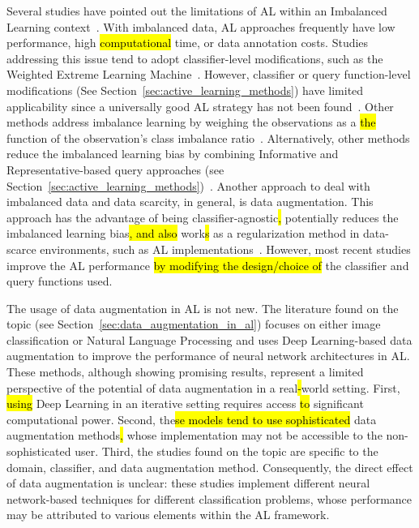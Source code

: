 \documentclass[preprint, 12pt]{elsarticle}
\begin{document}
Several studies have pointed out the limitations of AL within an Imbalanced
Learning context~\cite{Yu2019}. With imbalanced data, AL approaches frequently
have low performance, high \hl{computational} time, or\hl{ }data annotation
costs.  Studies addressing this issue tend to adopt classifier-level
modifications, such as the Weighted Extreme Learning Machine~\cite{Yu2019,
Zong2013, Qin2021}. However, classifier or query function-level modifications
(See Section~\ref{sec:active_learning_methods}) have limited applicability
since a universally good AL strategy has not been found~\cite{Sener2018}.
Other methods address imbalance learning by weighing the observations as a
\hl{the} function of the observation's class imbalance ratio~\cite{Liu2021}.
Alternatively, other methods\hl{ }reduce the imbalanced learning bias by
combining Informative and Representative-based query approaches (see
Section~\ref{sec:active_learning_methods})~\cite{Tharwat2020}. Another
approach to deal with imbalanced data and data scarcity, in general, is data
augmentation. This approach has the advantage of being\hl{
}classifier-agnostic\hl{, }potentially reduces the imbalanced learning
bias\hl{, and also} work\hl{s} as a regularization method in data-scarce
environments, such as AL implementations~\cite{Kim2021}. However, most recent
studies\hl{ }improve the AL performance \hl{by modifying the design/choice of}
the classifier and query functions used.
 
The usage of data augmentation in AL is not new. The literature found on the
topic (see Section~\ref{sec:data_augmentation_in_al}) focuses on either image
classification or Natural Language Processing and uses Deep Learning-based
data augmentation to improve the performance of neural network architectures
in AL\@. These methods, although showing promising results, represent a
limited perspective of the potential of data augmentation in a real\hl{-}world
setting. First, \hl{using} Deep Learning in an iterative setting requires\hl{
}access \hl{to} significant computational power. Second, the\hl{se models tend
to use sophisticated} data augmentation methods\hl{,} whose implementation may
not be accessible to the non-sophisticated user. Third, the studies found on
the topic are specific to the domain, classifier, and data augmentation
method.  Consequently, the direct effect of data augmentation is unclear:
these studies implement different neural network-based techniques for
different classification problems, whose performance may be attributed to
various elements within the AL framework.
\end{document}
